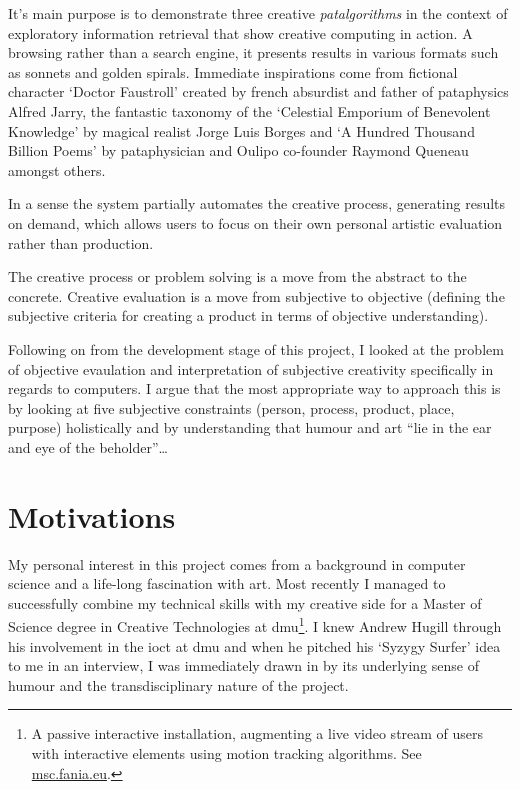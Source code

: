It's main purpose is to demonstrate three creative \textit{patalgorithms} in the context of exploratory information retrieval that show creative computing in action. A browsing rather than a search engine, it presents results in various formats such as sonnets and golden spirals. Immediate inspirations come from fictional character `Doctor Faustroll' created by french absurdist and father of pataphysics Alfred Jarry, the fantastic taxonomy of the `Celestial Emporium of Benevolent Knowledge' by magical realist Jorge Luis Borges and `A Hundred Thousand Billion Poems' by pataphysician and Oulipo co-founder Raymond Queneau amongst others.

In a sense the system partially automates the creative process, generating results on demand, which allows users to focus on their own personal artistic evaluation rather than production.


\begin{draft}
  The creative process or problem solving is a move from the abstract to the concrete. Creative evaluation is a move from subjective to objective (defining the subjective criteria for creating a product in terms of objective understanding).
\end{draft}

Following on from the development stage of this project, I looked at the problem of objective evaulation and interpretation of subjective creativity specifically in regards to computers. I argue that the most appropriate way to approach this is by looking at five subjective constraints (person, process, product, place, purpose) holistically and by understanding that humour and art ``lie in the ear and eye of the beholder''\ldots




\section{Motivations}

My personal interest in this project comes from a background in computer science and a life-long fascination with art. Most recently I managed to successfully combine my technical skills with my creative side for a Master of Science degree in Creative Technologies at \gls{dmu}\footnote{A passive interactive installation, augmenting a live video stream of users with interactive elements using motion tracking algorithms. See \url{msc.fania.eu}.}. I knew Andrew Hugill through his involvement in the \gls{ioct} at \gls{dmu} and when he pitched his `Syzygy Surfer' \autocite{Hendler2011, Hendler2013} idea to me in an interview, I was immediately drawn in by its underlying sense of humour and the transdisciplinary nature of the project.

